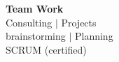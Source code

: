 \textbf{Team Work} \\
\midrule
Consulting $|$ Projects \\
brainstorming $|$ Planning \\
SCRUM (certified) 